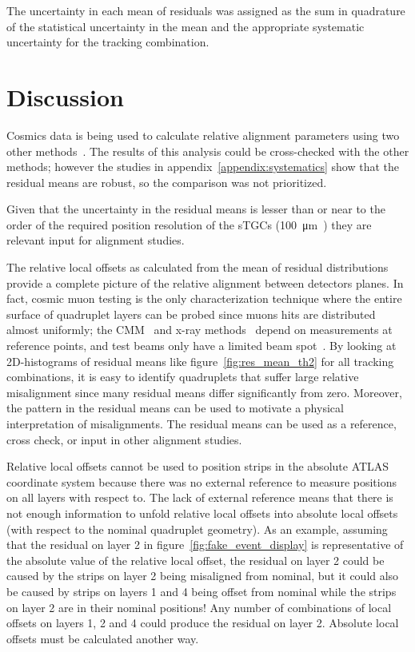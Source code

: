 The uncertainty in each mean of residuals was assigned as the sum in quadrature of the statistical uncertainty in the mean and the appropriate systematic uncertainty for the tracking combination. 

\section{Discussion}

Cosmics data is being used to calculate relative alignment parameters using two other methods~\cite{lefebvre_thesis}. The results of this analysis could be cross-checked with the other methods; however the studies in appendix~\ref{appendix:systematics} show that the residual means are robust, so the comparison was not prioritized.

Given that the uncertainty in the residual means is lesser than or near to the order of the required position resolution of the sTGCs (\SI{100}{\micro\meter}~\cite{nsw_tdr}) they are relevant input for alignment studies.

The relative local offsets as calculated from the mean of residual distributions provide a complete picture of the relative alignment between detectors planes. In fact, cosmic muon testing is the only characterization technique where the entire surface of quadruplet layers can be probed since muons hits are distributed almost uniformly; the CMM~\cite{carlson_results_2019} and x-ray methods~\cite{lefebvre_precision_2020} depend on measurements at reference points, and test beams only have a limited beam spot~\cite{abusleme_performance_2016}. By looking at 2D-histograms of residual means like figure~\ref{fig:res_mean_th2} for all tracking combinations, it is easy to identify quadruplets that suffer large relative misalignment since many residual means differ significantly from zero. Moreover, the pattern in the residual means can be used to motivate a physical interpretation of misalignments. The residual means can be used as a reference, cross check, or input in other alignment studies.

Relative local offsets cannot be used to position strips in the absolute ATLAS coordinate system because there was no external reference to measure positions on all layers with respect to. The lack of external reference means that there is not enough information to unfold relative local offsets into absolute local offsets (with respect to the nominal quadruplet geometry). As an example, assuming that the residual on layer 2 in figure~\ref{fig:fake_event_display} is representative of the absolute value of the relative local offset, the residual on layer 2 could be caused by the strips on layer 2 being misaligned from nominal, but it could also be caused by strips on layers 1 and 4 being offset from nominal while the strips on layer 2 are in their nominal positions! Any number of combinations of local offsets on layers 1, 2 and 4 could produce the residual on layer 2. Absolute local offsets must be calculated another way.
